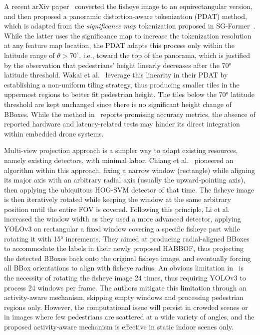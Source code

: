 \documentclass[twocolumn]{svjour3}          %
\begin{document}
A recent arXiv paper~\cite{wakai2025panoramic} converted the fisheye image to an equirectangular version, and then proposed a panoramic distortion-aware tokenization (PDAT) method, which is adapted from the \textit{significance map} tokenization proposed in SG-Former~\cite{sg-former}. While the latter uses the significance map to increase the tokenization resolution at any feature map location, the PDAT adapts this process only within the latitude range of $\theta > 70^\circ$, i.e., toward the top of the panorama, which is justified by the observation that pedestrians' height linearly decreases after the 70° latitude threshold. Wakai et al.~\cite{wakai2025panoramic} leverage this linearity in their PDAT by establishing a non-uniform tiling strategy, thus producing smaller tiles in the uppermost regions to better fit pedestrian height. The tiles below the 70° latitude threshold are kept unchanged since there is no significant height change of BBoxes. While the method in~\cite{wakai2025panoramic} reports promising accuracy metrics, the absence of reported hardware and latency-related tests may hinder its direct integration within embedded drone systems.

Multi-view projection approach is a simpler way to adapt existing resources, namely existing detectors, with minimal labor. Chiang et al.~\cite{chiang2014human} pioneered an algorithm within this approach, fixing a narrow window (rectangle) while aligning its major axis with an arbitrary radial axis (usually the upward-pointing axis), then applying the ubiquitous HOG-SVM detector of that time. The fisheye image is then iteratively rotated while keeping the window at the same arbitrary position until the entire FOV is covered. Following this principle, Li et al.~\cite{li2019supervised} increased the window width as they used a more advanced detector, applying YOLOv3 on rectangular a fixed window covering a specific fisheye part while rotating it with 15° increments. They aimed at producing radial-aligned BBoxes to accommodate the labels in their newly proposed HABBOF, thus projecting the detected BBoxes back onto the original fisheye image, and eventually forcing all BBox orientations to align with fisheye radius. An obvious limitation in~\cite{li2019supervised} is the necessity of rotating the fisheye image 24 times, thus requiring YOLOv3 to process 24 windows per frame. The authors mitigate this limitation through an activity-aware mechanism, skipping empty windows and processing pedestrian regions only. However, the computational issue will persist in crowded scenes or in images where few pedestrians are scattered at a wide variety of angles, and the proposed activity-aware mechanism is effective in static indoor scenes only.
\end{document}
